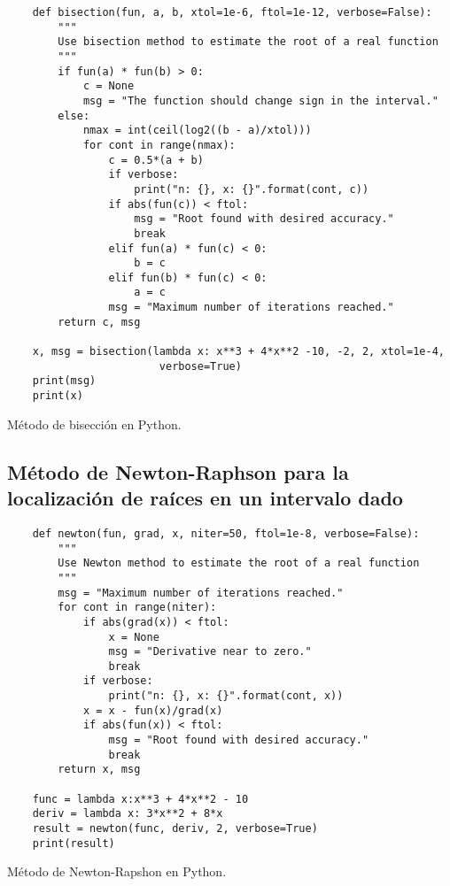 \begin{listing}[H]
    \begin{verbatim}
    def bisection(fun, a, b, xtol=1e-6, ftol=1e-12, verbose=False):
        """
        Use bisection method to estimate the root of a real function
        """
        if fun(a) * fun(b) > 0:
            c = None
            msg = "The function should change sign in the interval."
        else:
            nmax = int(ceil(log2((b - a)/xtol)))
            for cont in range(nmax):
                c = 0.5*(a + b)
                if verbose:
                    print("n: {}, x: {}".format(cont, c))
                if abs(fun(c)) < ftol:
                    msg = "Root found with desired accuracy."
                    break
                elif fun(a) * fun(c) < 0:
                    b = c
                elif fun(b) * fun(c) < 0:
                    a = c
                msg = "Maximum number of iterations reached."
        return c, msg
    
    x, msg = bisection(lambda x: x**3 + 4*x**2 -10, -2, 2, xtol=1e-4,
                        verbose=True)
    print(msg)
    print(x)
    \end{verbatim}
    \caption{Método de bisección en Python.}
    \label{lst:bisection}
\end{listing}


\subsection{Método de Newton-Raphson para la localización de raíces en un 
intervalo dado}

\begin{listing}[H]
    \begin{verbatim}
    def newton(fun, grad, x, niter=50, ftol=1e-8, verbose=False):
        """
        Use Newton method to estimate the root of a real function
        """
        msg = "Maximum number of iterations reached."
        for cont in range(niter):
            if abs(grad(x)) < ftol:
                x = None
                msg = "Derivative near to zero."
                break
            if verbose:
                print("n: {}, x: {}".format(cont, x))
            x = x - fun(x)/grad(x)
            if abs(fun(x)) < ftol:
                msg = "Root found with desired accuracy."
                break
        return x, msg
    
    func = lambda x:x**3 + 4*x**2 - 10
    deriv = lambda x: 3*x**2 + 8*x
    result = newton(func, deriv, 2, verbose=True)
    print(result)
    \end{verbatim}
    \caption{Método de Newton-Rapshon en Python.}
    \label{lst:newton-raphson}
\end{listing}



